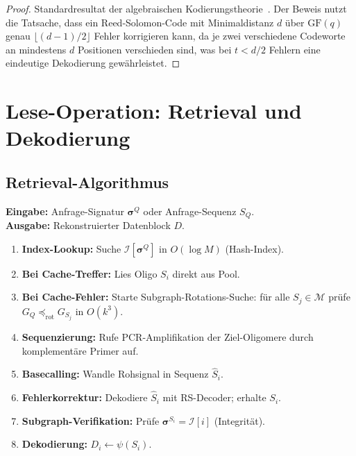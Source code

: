 ﻿\documentclass[a4paper,12pt]{article}
\theoremstyle{definition}
\begin{document}
\begin{proof}
    Standardresultat der algebraischen Kodierungstheorie~\cite{reedsolomon1960}.
    Der Beweis nutzt die Tatsache, dass ein Reed-Solomon-Code mit
    Minimaldistanz $d$ \"{u}ber $\mathrm{GF}(q)$ genau $\lfloor(d-1)/2\rfloor$
    Fehler korrigieren kann, da je zwei verschiedene Codeworte an mindestens
    $d$ Positionen verschieden sind, was bei $t < d/2$ Fehlern eine
    eindeutige Dekodierung gew\"{a}hrleistet. 
\end{proof}

\section{Lese-Operation: Retrieval und Dekodierung}
\label{sec:lesen}

\subsection{Retrieval-Algorithmus}

\textbf{Eingabe:} Anfrage-Signatur $\boldsymbol{\sigma}^Q$ oder
Anfrage-Sequenz $S_Q$.\\
\textbf{Ausgabe:} Rekonstruierter Datenblock $D$.

\begin{enumerate}
    \item \textbf{Index-Lookup:} Suche
          $\mathcal{I}[\boldsymbol{\sigma}^Q]$ in $O(\log M)$
          (Hash-Index).
    \item \textbf{Bei Cache-Treffer:} Lies Oligo $S_i$ direkt aus Pool.
    \item \textbf{Bei Cache-Fehler:} Starte Subgraph-Rotations-Suche:
          f\"{u}r alle $S_j \in \mathcal{M}$ pr\"{u}fe
          $G_Q \preceq_{\mathrm{rot}} G_{S_j}$ in $O(k^3)$.
    \item \textbf{Sequenzierung:} Rufe PCR-Amplifikation der
          Ziel-Oligomere durch komplementäre Primer auf.
    \item \textbf{Basecalling:} Wandle Rohsignal in Sequenz $\hat{S}_i$.
    \item \textbf{Fehlerkorrektur:} Dekodiere $\hat{S}_i$ mit
          RS-Decoder; erhalte $S_i$.
    \item \textbf{Subgraph-Verifikation:} Pr\"{u}fe
          $\boldsymbol{\sigma}^{S_i} = \mathcal{I}[i]$ (Integrit\"{a}t).
    \item \textbf{Dekodierung:} $D_i \leftarrow \psi(S_i)$.
\end{enumerate}
\end{document}

